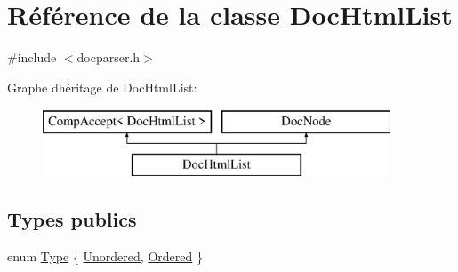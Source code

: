\hypertarget{class_doc_html_list}{}\section{Référence de la classe Doc\+Html\+List}
\label{class_doc_html_list}


{\ttfamily \#include $<$docparser.\+h$>$}

Graphe d\textquotesingle{}héritage de Doc\+Html\+List\+:\begin{figure}[H]
\begin{center}
\leavevmode
\includegraphics[height=2.000000cm]{class_doc_html_list}
\end{center}
\end{figure}
\subsection*{Types publics}
\begin{DoxyCompactItemize}
\item 
enum \hyperlink{class_doc_html_list_af05523650adffbefb14392d8f9f23487}{Type} \{ \hyperlink{class_doc_html_list_af05523650adffbefb14392d8f9f23487a00e869c50ba4a1783724e11d45870c44}{Unordered}, 
\hyperlink{class_doc_html_list_af05523650adffbefb14392d8f9f23487a8642714056eb3abfd3972a5dec674042}{Ordered}
 \}
\end{DoxyCompactItemize}

